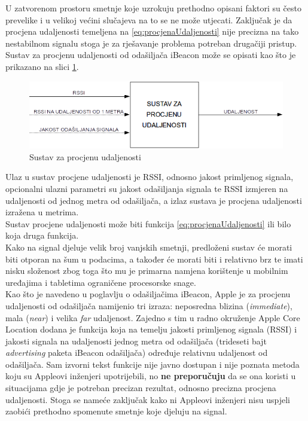 U zatvorenom prostoru smetnje koje uzrokuju prethodno opisani faktori su često prevelike i u velikoj većini slučajeva na to se ne može utjecati. 
Zaključak je da procjena udaljenosti temeljena na \eqref{eq:procjenaUdaljenosti} nije precizna na tako nestabilnom signalu stoga je za rješavanje problema potreban drugačiji pristup.
\\

Sustav za procjenu udaljenosti od odašiljača iBeacon može se opisati kao što je prikazano na slici \ref{fig:sustavZaProcjenuUdaljenosti}.

\begin{figure}[H]
    \centering
    \includegraphics[scale=0.68]{pictures/sustav-za-procjenu-udaljenosti}
    \caption{Sustav za procjenu udaljenosti}
    \label{fig:sustavZaProcjenuUdaljenosti}
\end{figure}

Ulaz u sustav procjene udaljenosti je RSSI, odnosno jakost primljenog signala, opcionalni ulazni parametri su jakost odašiljanja signala te RSSI izmjeren na udaljenosti od jednog metra od odašiljača, a izlaz sustava je procjena udaljenosti izražena u metrima.
\\
Sustav procjene udaljenosti može biti funkcija \eqref{eq:procjenaUdaljenosti} ili bilo koja druga funkcija.
\\
Kako na signal djeluje velik broj vanjskih smetnji, predloženi sustav će morati biti otporan na šum u podacima, a također će morati biti i relativno brz te imati nisku složenost zbog toga što mu je primarna namjena korištenje u mobilnim uređajima i tabletima ograničene procesorske snage. 
\\

Kao što je navedeno u poglavlju o odašiljačima iBeacon, Apple je za procjenu udaljenosti od odašiljača namijenio tri izraza: neposredna blizina (\textit{immediate}), mala (\textit{near}) i velika \textit{far} udaljenost.
Zajedno s tim u radno okruženje Apple Core Location dodana je funkcija koja na temelju jakosti primljenog signala (RSSI) i jakosti signala na udaljenosti jednog metra od odašiljača (trideseti bajt \textit{advertising} paketa iBeacon odašiljača) određuje relativnu udaljenost od odašiljača. 
Sam izvorni tekst funkcije nije javno dostupan i nije poznata metoda koju su Appleovi inženjeri upotrijebili, no \textbf{ne preporučuju} da se ona koristi u situacijama gdje je potreban precizan rezultat, odnosno precizna procjena udaljenosti. 
Stoga se nameće zaključak kako ni Appleovi inženjeri nisu uspjeli zaobići prethodno spomenute smetnje koje djeluju na signal.
\\

